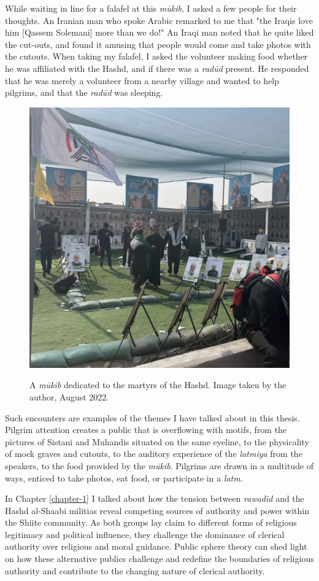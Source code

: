 While waiting in line for a falafel at this \emph{mūkib}, I asked a few people for their thoughts. An Iranian man who spoke Arabic remarked to me that "the Iraqis love him [Qassem Solemani] more than we do!" An Iraqi man noted that he quite liked the cut-outs, and found it amusing that people would come and take photos with the cutouts. When taking my falafel, I asked the volunteer making food whether he was affiliated with the Hashd, and if there was a \emph{radūd} present. He responded that he was merely a volunteer from a nearby village and wanted to help pilgrims, and that the \emph{radūd} was sleeping. 

\begin{figure}[h]
\caption{A \emph{mūkib} dedicated to the martyrs of the Hashd. Image taken by the author, August 2022.}
\centering
\includegraphics[width=.75\textwidth]{images/qassem-mowkeb.jpeg}
\label{fig:qassem-mowkeb}
\end{figure}

Such encounters are examples of the themes I have talked about in this thesis. Pilgrim attention creates a public that is overflowing with motifs, from the pictures of Sistani and Muhandis situated on the same eyeline, to the physicality of mock graves and cutouts, to the auditory experience of the \emph{latmiya} from the speakers, to the food provided by the \emph{mūkib}. Pilgrims are drawn in a multitude of ways, enticed to take photos, eat food, or participate in a \emph{latm}. 

In Chapter \ref{chapter-1} I talked about how the tension between \emph{rawadīd} and the Hashd al-Shaabi militias reveal competing sources of authority and power within the Shiite community. As both groups lay claim to different forms of religious legitimacy and political influence, they challenge the dominance of clerical authority over religious and moral guidance. Public sphere theory can shed light on how these alternative publics challenge and redefine the boundaries of religious authority and contribute to the changing nature of clerical authority. 

